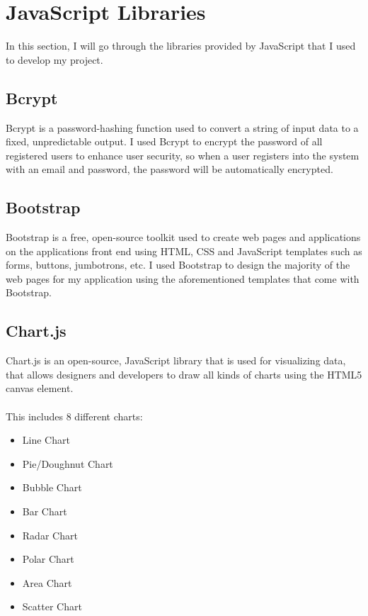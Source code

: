 \section{JavaScript Libraries}

In this section, I will go through the libraries provided by JavaScript that I used to develop my project.

\subsection{Bcrypt}

Bcrypt is a password-hashing function used to convert a string of input data to a fixed, unpredictable output. I used Bcrypt to encrypt the password of all registered users to enhance user security, so when a user registers into the system with an email and password, the password will be automatically encrypted.

\subsection{Bootstrap}

Bootstrap is a free, open-source toolkit used to create web pages and applications on the applications front end using HTML, CSS and JavaScript templates such as forms, buttons, jumbotrons, etc. I used Bootstrap to design the majority of the web pages for my application using the aforementioned templates that come with Bootstrap.

\subsection{Chart.js}

Chart.js is an open-source, JavaScript library that is used for visualizing data, that allows designers and developers to draw all kinds of charts using the HTML5 canvas element.\\ \\
This includes 8 different charts:

\begin{itemize}
    \item Line Chart
    \item Pie/Doughnut Chart
    \item Bubble Chart
    \item Bar Chart
    \item Radar Chart
    \item Polar Chart
    \item Area Chart
    \item Scatter Chart
\end{itemize}

